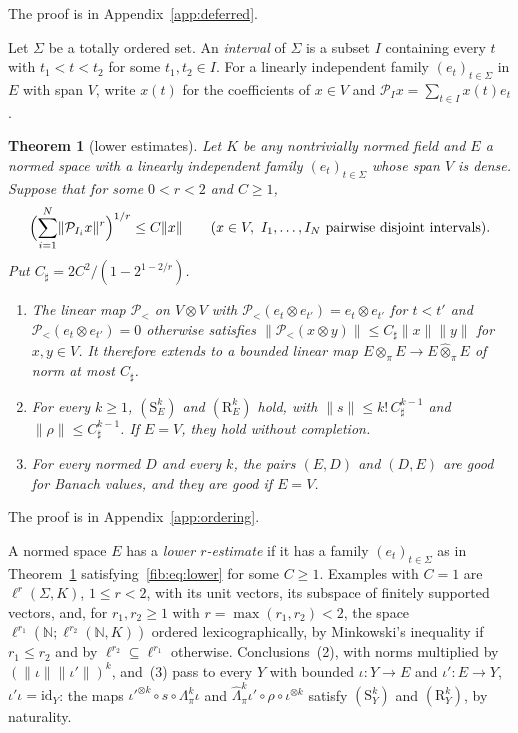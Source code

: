 \documentclass[11pt]{amsart}
\newtheorem{theorem}{Theorem}[section]
\theoremstyle{definition}
\theoremstyle{remark}
\numberwithin{equation}{section}
\newcommand{\N}{\mathbb N}
\newcommand{\id}{\mathrm{id}}
\newcommand{\norm}[1]{\lVert #1\rVert}
\theoremstyle{plain}
\theoremstyle{definition}
\theoremstyle{plain}
\newcommand{\cP}{\mathcal P}
\begin{document}
The proof is in Appendix~\ref{app:deferred}.

Let $\Sigma$ be a totally ordered set. An \emph{interval} of $\Sigma$ is a subset $I$ containing every $t$ with
$t_1<t<t_2$ for some $t_1,t_2\in I$. For a linearly independent family $(e_t)_{t\in\Sigma}$ in $E$ with span $V$, write
$x(t)$ for the coefficients of $x\in V$ and $\cP_Ix=\sum_{t\in I}x(t)e_t$.

\begin{theorem}[lower estimates]\label{fib:thm:lower}
Let $K$ be any nontrivially normed field and $E$ a normed space with a linearly independent family $(e_t)_{t\in\Sigma}$
whose span $V$ is dense. Suppose that for some $0<r<2$ and $C\ge1$,
\begin{equation}\label{fib:eq:lower}
 \Bigl(\sum_{i=1}^N\norm{\cP_{I_i}x}^r\Bigr)^{1/r}\le C\norm x
 \qquad(x\in V,\ I_1,\dots,I_N\text{ pairwise disjoint intervals}).
\end{equation}
Put $C_\sharp=2C^2/(1-2^{1-2/r})$.
\begin{enumerate}
\item The linear map $\cP_<$ on $V\otimes V$ with $\cP_<(e_t\otimes e_{t'})=e_t\otimes e_{t'}$ for $t<t'$ and
$\cP_<(e_t\otimes e_{t'})=0$ otherwise satisfies $\norm{\cP_<(x\otimes y)}\le C_\sharp\norm x\norm y$ for $x,y\in V$. It
therefore extends to a bounded linear map $E\otimes_\pi E\to E\widehat\otimes_\pi E$ of norm at most $C_\sharp$.
\item For every $k\ge1$, $(\mathrm S^k_E)$ and $(\mathrm R^k_E)$ hold, with $\norm s\le k!\,C_\sharp^{k-1}$ and
$\norm\rho\le C_\sharp^{k-1}$. If $E=V$, they hold without completion.
\item For every normed $D$ and every $k$, the pairs $(E,D)$ and $(D,E)$ are good for Banach values, and they are good
if $E=V$.
\end{enumerate}
\end{theorem}
The proof is in Appendix~\ref{app:ordering}.

A normed space $E$ has a \emph{lower $r$\nobreakdash-estimate} if it has a family $(e_t)_{t\in\Sigma}$ as in
Theorem~\ref{fib:thm:lower} satisfying~\eqref{fib:eq:lower} for some $C\ge1$. Examples with $C=1$ are $\ell^r(\Sigma,K)$,
$1\le r<2$, with its unit vectors, its subspace of finitely supported vectors, and, for $r_1,r_2\ge1$ with
$r=\max(r_1,r_2)<2$, the space $\ell^{r_1}(\N;\ell^{r_2}(\N,K))$ ordered lexicographically, by Minkowski's inequality if
$r_1\le r_2$ and by $\ell^{r_2}\subseteq\ell^{r_1}$ otherwise. Conclusions~(2), with norms multiplied by
$(\norm\iota\norm{\iota'})^k$, and~(3) pass to every $Y$ with bounded $\iota\colon Y\to E$ and $\iota'\colon E\to Y$,
$\iota'\iota=\id_Y$: the maps $\iota'^{\otimes k}\circ s\circ\Lambda^k_\pi\iota$ and
$\widehat\Lambda^k_\pi\iota'\circ\rho\circ\iota^{\otimes k}$ satisfy $(\mathrm S^k_Y)$ and $(\mathrm R^k_Y)$, by naturality.
\end{document}
